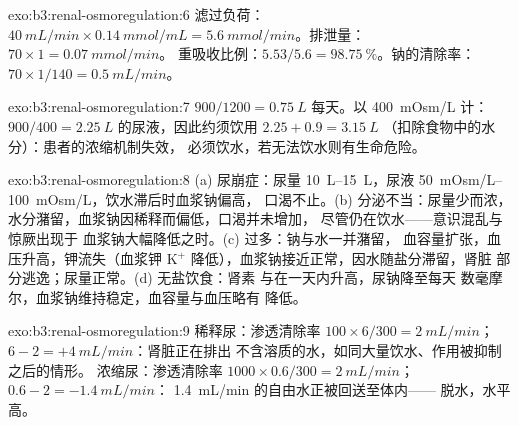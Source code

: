 \begin{solution}{exo:b3:renal-osmoregulation:6}
滤过负荷：$\qty{40}{mL/min}\times\qty{0.14}{mmol/mL} =
\qty{5.6}{mmol/min}$。排泄量：$70\times 1 = \qty{0.07}{mmol/min}$。
重吸收比例：$5.53/5.6 = \qty{98.75}{\%}$。钠的清除率：$70\times
1/140 = \qty{0.5}{mL/min}$。
\end{solution}

\begin{solution}{exo:b3:renal-osmoregulation:7}
$900/1200 = \qty{0.75}{L}$ 每天。以 \qty{400}{mOsm/L} 计：$900/400 =
\qty{2.25}{L}$ 的尿液，因此约须饮用 $2.25 + 0.9 = \qty{3.15}{L}$
（扣除食物中的水分）：患者的浓缩机制失效，
必须饮水，若无法饮水则有生命危险。
\end{solution}

\begin{solution}{exo:b3:renal-osmoregulation:8}
(a) 尿崩症：尿量 \qtyrange{10}{15}{L}，尿液
\qtyrange{50}{100}{mOsm/L}，饮水滞后时血浆钠偏高，
口渴不止。(b) 分泌不当：尿量少而浓，
水分潴留，血浆钠因稀释而偏低，口渴并未增加，
尽管仍在饮水——意识混乱与惊厥出现于
血浆钠大幅降低之时。(c) 过多：钠与水一并潴留，
血容量扩张，血压升高，钾流失（血浆钾
K$^{+}$ 降低），血浆钠接近正常，因水随盐分滞留，肾脏
部分逃逸；尿量正常。(d) 无盐饮食：肾素
与在一天内升高，尿钠降至每天
数毫摩尔，血浆钠维持稳定，血容量与血压略有
降低。
\end{solution}

\begin{solution}{exo:b3:renal-osmoregulation:9}
稀释尿：渗透清除率 $100\times 6/300 = \qty{2}{mL/min}$；
 $6 - 2 = +\qty{4}{mL/min}$：肾脏正在排出
不含溶质的水，如同大量饮水、作用被抑制之后的情形。
浓缩尿：渗透清除率 $1000\times 0.6/300 =
\qty{2}{mL/min}$； $0.6 - 2 = -\qty{1.4}{mL/min}$：
\qty{1.4}{mL/min} 的自由水正被回送至体内——
脱水，水平高。
\end{solution}

